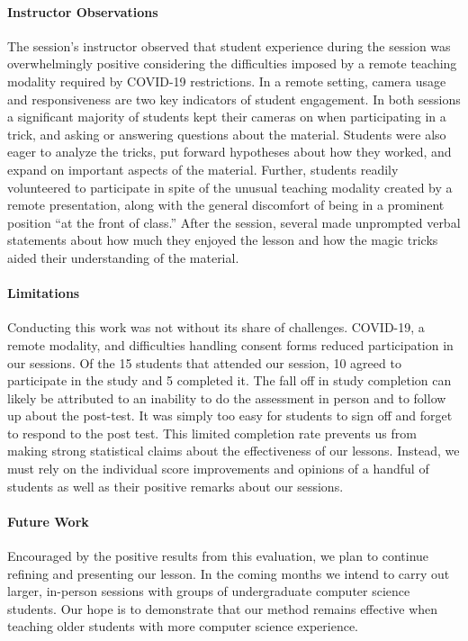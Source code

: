 \paragraph{Instructor Observations}
The session's instructor observed that student experience during
the session was overwhelmingly positive considering
the difficulties imposed by a remote teaching modality required by COVID-19
restrictions.
In a remote setting, camera usage
and responsiveness are two key indicators of student engagement.
In both sessions a significant majority of students kept their cameras on
when participating in a trick, and asking or answering questions
about the material.
Students were also
eager to analyze the
tricks, put forward hypotheses about how they worked,
and expand on important aspects of the material.
Further, students readily volunteered to participate in spite
of the unusual teaching modality created by a remote presentation,
along with the general discomfort of being in a
prominent position ``at the front of class.''
After the session,
several
made
unprompted verbal statements about how much they enjoyed the
lesson and how the magic tricks aided their understanding of the
material.


\paragraph{Limitations}

Conducting this work was not without its share of challenges.
COVID-19, a remote modality, and difficulties handling consent forms
reduced participation in our sessions.
Of the 15 students that attended our session, 10 agreed to participate in
the study and 5 completed it.
The fall off in study completion can likely be attributed to
an inability to
do the assessment in person and to
follow up about the post-test.
It was simply too easy for students to sign off and forget
to respond to the post test.
This limited completion rate prevents us from making strong
statistical claims about the effectiveness of our lessons.
Instead, we must rely on the individual score improvements and opinions
of a handful of students as well as their positive remarks about
our sessions.



\paragraph{Future Work}
Encouraged by the positive results from this evaluation,
we plan to continue refining and presenting our lesson.
In the coming months we intend to carry out larger, in-person sessions
with groups of undergraduate computer science students.
Our hope is to demonstrate that our method remains effective
when teaching older students with more computer science experience.
